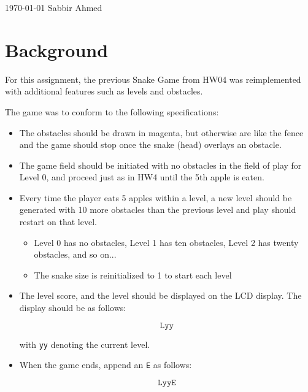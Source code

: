 \documentclass[paper=usletter, fontsize=12pt]{article}
\begin{document}
    {\today} {Sabbir Ahmed}
    \vspace{-0.1in}

    \section{Background} For this assignment, the previous Snake Game from HW04
    was reimplemented with additional features such as levels and obstacles.

    The game was to conform to the following specifications:

        \begin{itemize}

            \item The obstacles should be drawn in magenta, but otherwise are
            like the fence and the game should stop once the snake (head)
            overlays an obstacle.

            \item The game field should be initiated with no obstacles in the
            field of play for Level 0, and proceed just as in HW4 until the 5th
            apple is eaten.

            \item Every time the player eats 5 apples within a level, a new
            level should be generated with 10 more obstacles than the previous
            level and play should restart on that level.

                \begin{itemize}

                    \item Level 0 has no obstacles, Level 1 has ten obstacles,
                    Level 2 has twenty obstacles, and so on...

                    \item The snake size is reinitialized to 1 to start each
                    level

                \end{itemize}

            \item The level score, and the level should be displayed on the LCD
            display. The display should be as follows:

                \[ \texttt{Lyy} \]

                with \texttt{yy} denoting the current level.

            \item When the game ends, append an \texttt{E} as follows:

                \[ \texttt{LyyE} \]

        \end{itemize}
\end{document}
